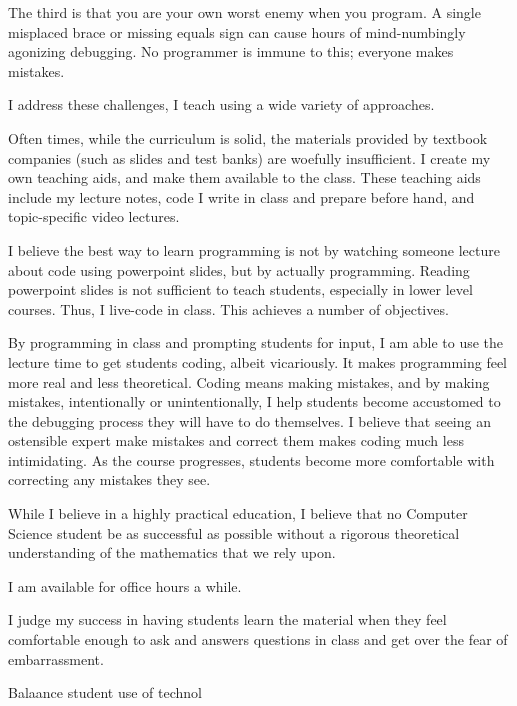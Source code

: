 \documentclass[10pt, a4paper]{article}
\begin{document}
The third is that you are your own worst enemy when you program.
A single misplaced brace or missing equals sign can cause hours of mind-numbingly agonizing debugging.
No programmer is immune to this; everyone makes mistakes.

I address these challenges, I teach using a wide variety of approaches.


Often times, while the curriculum is solid, the materials provided by textbook companies (such as slides and test banks) are woefully insufficient.
I create my own teaching aids, and make them available to the class.
These teaching aids include my lecture notes, code I write in class and prepare before hand, and topic-specific video lectures.



I believe the best way to learn programming is not by watching someone lecture about code using powerpoint slides, but by actually programming.
Reading powerpoint slides is not sufficient to teach students, especially in lower level courses.
Thus, I live-code in class.
This achieves a number of objectives.

By programming in class and prompting students for input, I am able to use the lecture time to get students coding, albeit vicariously.
It makes programming feel more real and less theoretical.
Coding means making mistakes, and by making mistakes, intentionally or unintentionally, I help students become accustomed to the debugging process they will have to do themselves.
I believe that seeing an ostensible expert make mistakes and correct them makes coding much less intimidating.
As the course progresses, students become more comfortable with correcting any mistakes they see.


While I believe in a highly practical education, I believe that no Computer Science student be as successful as possible without a rigorous theoretical understanding of the mathematics that we rely upon.

























I am available for office hours a while.


I judge my success in having students learn the material when they feel comfortable enough to ask and  answers questions in class and get over the fear of embarrassment.


Balaance student use of technol
\end{document}
